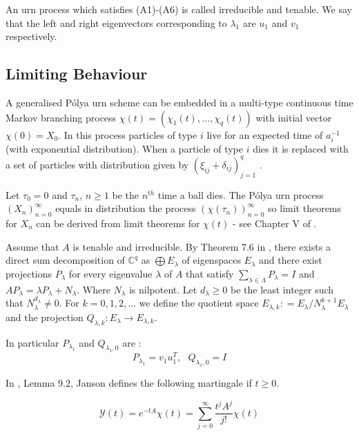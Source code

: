 \documentclass[12pt]{article} %
\theoremstyle{definition}
\begin{document}
 An urn process which satisfies (A1)-(A6) is called irreducible and tenable.  We say that the left and right eigenvectors corresponding to $\lambda_{1}$ are $u_{1}$ and $v_{1}$ respectively.
 
\subsection{Limiting Behaviour} 
 
A generalised P\'{o}lya urn scheme can be embedded in a multi-type continuous time Markov branching process $\chi(t) = (\chi_{1}(t), \dots, \chi_{q}(t))$ with initial vector $\chi(0) = X_{0}$.  In this process particles of type $i$ live for an expected time of $a_{i}^{-1}$ (with exponential distribution).  When a particle of type $i$ dies it is replaced with a set of particles with distribution given by $(\xi_{ij} + \delta_{ij})_{j=1}^{q}$ \cite{Athreya}.  

Let $\tau_{0} = 0$ and $\tau_{n}$, $n \geq 1$ be the $n^{th}$ time %
a ball dies. The P\'{o}lya urn process $(X_{n})_{n=0}^{\infty}$ equals in distribution the process $(\chi(\tau_{n}))_{n=0}^{\infty}$ so limit theorems for $X_{n}$ can be derived from limit theorems for $\chi(t)$ - see Chapter V of \cite{Athreya}.
 
Assume that $A$ is tenable and irreducible.  By Theorem 7.6 in \cite{linalg}, there exists a direct sum decomposition of $\mathbb{C}^{q}$ as $\bigoplus E_{\lambda}$ of eigenspaces $E_{\lambda}$ and there exist projections $P_{\lambda}$ for every eigenvalue $\lambda$ of $A$ that satisfy $\sum_{\lambda \in \Lambda}P_{\lambda} = I$ and $ AP_{\lambda} = \lambda P_{\lambda} + N_{\lambda}$.  Where $N_{\lambda}$ is nilpotent. Let $d_{\lambda} \geq 0 $ be the least integer such that $N_{\lambda}^{d_{\lambda}} \neq 0$.  For $k = 0,1,2,\dots$ we define the quotient space $E_{\lambda,k}: = E_{\lambda}/N_{\lambda}^{k+1}E_{\lambda}$ and the projection $Q_{\lambda,k}:E_{\lambda} \rightarrow E_{\lambda,k}$.
 
In particular $P_{\lambda_{1}}$ and $Q_{\lambda_{1},0}$ are \cite{JansonSPATA}:
\begin{equation}\label{eq5}
 P_{\lambda_{1}} = v_{1}u_{1}^{T},\text{           } Q_{\lambda_{1},0} = I
\end{equation}
 
In \cite{JansonSPATA}, Lemma 9.2, Janson defines the following martingale if $t \geq 0$.
 
\[
 \mathcal{Y}(t) = e^{-tA}\chi(t) = \sum_{j=0}^{\infty} \frac{t^{j}A^{j}}{j!}\chi(t)
\]
\end{document}
